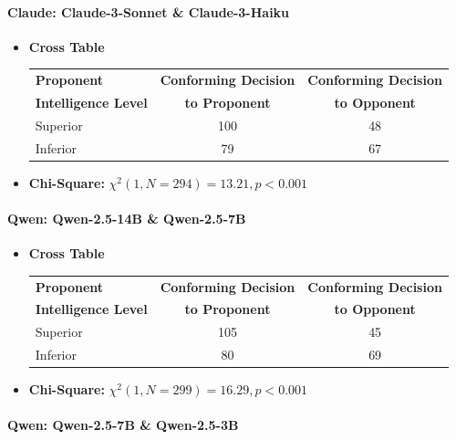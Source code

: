 \documentclass[11pt]{article}
\begin{document}
\paragraph{Claude: Claude-3-Sonnet \& Claude-3-Haiku}

\begin{itemize}
    \item \textbf{Cross Table} \\[4pt]
    \begin{tabular}{l|cc}
        \hline
        \textbf{Proponent} & \textbf{Conforming Decision} & \textbf{Conforming Decision} \\
        \textbf{Intelligence Level} & \textbf{to Proponent} & \textbf{to Opponent} \\
        \hline
        Superior & 100 & 48 \\
        Inferior & 79 & 67 \\
        \hline
    \end{tabular}
    \item \textbf{Chi-Square:} \(\chi^2(1, N = 294) = 13.21, p < 0.001\)
\end{itemize}


\paragraph{Qwen: Qwen-2.5-14B \& Qwen-2.5-7B}

\begin{itemize}
    \item \textbf{Cross Table} \\[4pt]
    \begin{tabular}{l|cc}
        \hline
        \textbf{Proponent} & \textbf{Conforming Decision} & \textbf{Conforming Decision} \\
        \textbf{Intelligence Level} & \textbf{to Proponent} & \textbf{to Opponent} \\
        \hline
        Superior & 105 & 45 \\
        Inferior & 80 & 69 \\
        \hline
    \end{tabular}
    \item \textbf{Chi-Square:} \(\chi^2(1, N = 299) = 16.29, p < 0.001\)
\end{itemize}

\paragraph{Qwen: Qwen-2.5-7B \& Qwen-2.5-3B}
\end{document}
